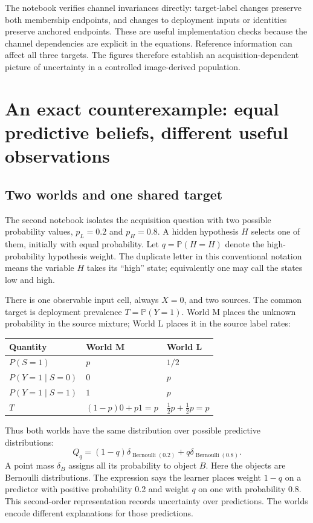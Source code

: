 \documentclass[11pt,a4paper]{report}
\newcommand{\Prob}{\mathbb P}
\newcommand{\Bern}{\operatorname{Bernoulli}}
\begin{document}
The notebook verifies channel invariances directly: target-label changes preserve both membership endpoints, and changes to deployment inputs or identities preserve anchored endpoints. These are useful implementation checks because the channel dependencies are explicit in the equations. Reference information can affect all three targets. The figures therefore establish an acquisition-dependent picture of uncertainty in a controlled image-derived population.

\chapter{An exact counterexample: equal predictive beliefs, different useful observations}
\section{Two worlds and one shared target}
The second notebook isolates the acquisition question with two possible probability values, $p_L=0.2$ and $p_H=0.8$. A hidden hypothesis $H$ selects one of them, initially with equal probability. Let $q=\Prob(H=H)$ denote the high-probability hypothesis weight. The duplicate letter in this conventional notation means the variable $H$ takes its ``high'' state; equivalently one may call the states low and high.

There is one observable input cell, always $X=0$, and two sources. The common target is deployment prevalence $T=\Prob(Y=1)$. World M places the unknown probability in the source mixture; World L places it in the source label rates:
\begin{center}
\begin{tabular}{p{}p{}p{}}\toprule
Quantity & World M & World L\\\midrule
$P(S=1)$ & $p$ & $1/2$\\
$P(Y=1\mid S=0)$ & $0$ & $p$\\
$P(Y=1\mid S=1)$ & $1$ & $p$\\
$T$ & $(1-p)0+p1=p$ & $\frac12p+\frac12p=p$\\\bottomrule
\end{tabular}
\end{center}
Thus both worlds have the same distribution over possible predictive distributions:
\begin{equation}
Q_q=(1-q)\delta_{\Bern(0.2)}+q\delta_{\Bern(0.8)}.
\end{equation}
A point mass $\delta_B$ assigns all its probability to object $B$. Here the objects are Bernoulli distributions. The expression says the learner places weight $1-q$ on a predictor with positive probability 0.2 and weight $q$ on one with probability 0.8. This second-order representation records uncertainty over predictions. The worlds encode different explanations for those predictions.
\end{document}
